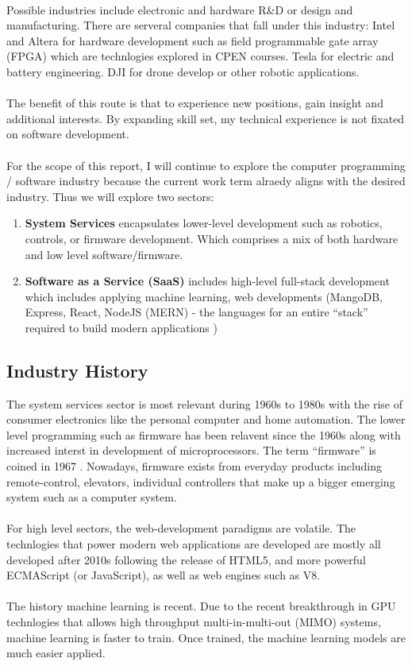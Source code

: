 \documentclass[10pt,letterpaper]{article}
\begin{document}
\\
Possible industries include electronic and hardware R\&D or design and manufacturing. There are serveral companies that fall under this industry: Intel and Altera for hardware development such as field programmable gate array (FPGA) which are technlogies explored in CPEN courses. Tesla for electric and battery engineering. DJI for drone develop or other robotic applications.\\
\\
The benefit of this route is that to experience new positions, gain insight and additional interests. By expanding skill set, my technical experience is not fixated on software development.\\
\\
For the scope of this report, I will continue to explore the computer programming / software industry because the current work term alraedy aligns with the desired industry\cite{coop-handbook}. Thus we will explore two sectors:
\begin{enumerate}
	\item
		\textbf{System Services}\cite{software-industry} encapsulates lower-level development such as robotics, controls, or firmware development. Which comprises a mix of both hardware and low level software/firmware.

	\item
		\textbf{Software as a Service (SaaS)}\cite{saas} includes high-level full-stack development which includes applying machine learning, web developments (MangoDB, Express, React, NodeJS (MERN) - the languages for an entire ``stack'' required to build modern applications \cite{mern})
\end{enumerate}
\subsection{Industry History}
The system services sector is most relevant during 1960s to 1980s with the rise of consumer electronics like the personal computer and home automation. The lower level programming such as firmware has been relavent since the 1960s along with increased interst in development of microprocessors. The term ``firmware'' is coined in 1967 \cite{firmware-term}. Nowadays, firmware exists from everyday products including remote-control, elevators, individual controllers that make up a bigger emerging system such as a computer system.\\
\\
For high level sectors, the web-development paradigms are volatile. The technlogies that power modern web applications are developed are mostly all developed after 2010s following the release of HTML5, and more powerful ECMAScript (or JavaScript), as well as web engines such as V8\cite{html5, ecmascript, v8engine}.\\
\\
The history machine learning is recent. Due to the recent breakthrough in GPU technlogies that allows high throughput multi-in-multi-out (MIMO) systems, machine learning is faster to train. Once trained, the machine learning models are much easier applied.\cite{gpu-ml}\\
\end{document}
